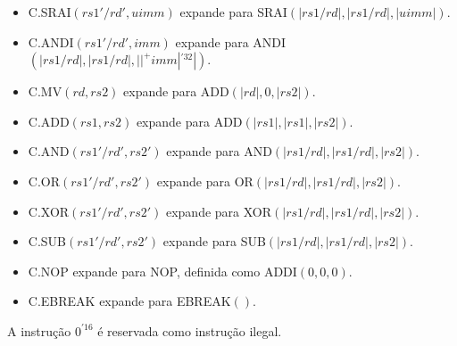 \begin{itemize}
  \item C.SRAI$(rs1'/rd', uimm)$ expande para SRAI$(|rs1/rd|, |rs1/rd|, |uimm|)$.
  \item C.ANDI$(rs1'/rd', imm)$ expande para ANDI$(|rs1/rd|, |rs1/rd|, ||^+imm|^{'32}|)$.
  \item C.MV$(rd, rs2)$ expande para ADD$(|rd|, 0, |rs2|)$.
  \item C.ADD$(rs1, rs2)$ expande para ADD$(|rs1|, |rs1|, |rs2|)$.
  \item C.AND$(rs1'/rd', rs2')$ expande para AND$(|rs1/rd|, |rs1/rd|, |rs2|)$.
  \item C.OR$(rs1'/rd', rs2')$ expande para OR$(|rs1/rd|, |rs1/rd|, |rs2|)$.
  \item C.XOR$(rs1'/rd', rs2')$ expande para XOR$(|rs1/rd|, |rs1/rd|, |rs2|)$.
  \item C.SUB$(rs1'/rd', rs2')$ expande para SUB$(|rs1/rd|, |rs1/rd|, |rs2|)$.
  \item C.NOP expande para NOP, definida como ADDI$(0,0,0)$.
  \item C.EBREAK expande para EBREAK$()$.
  \end{itemize}

  A instrução $0^{'16}$ é reservada como instrução ilegal.

